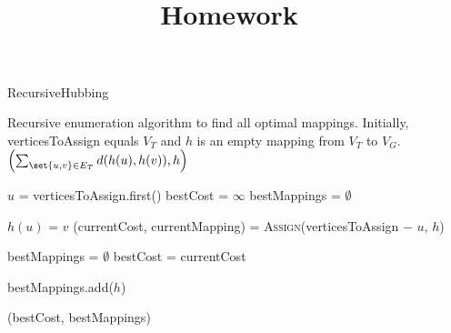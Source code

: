 \documentclass[language=english, number=1]{../lib/homework}
\title{\textbf{\hw@coursename}\\Homework~\hw@number}%
\begin{document}

    \begin{algorithm}
        \caption{RecursiveHubbing}
        \label{alg:TriangulateStar}
        \begin{algorithmic}[1]
            \Statex Recursive enumeration algorithm to find all optimal mappings. Initially, verticesToAssign equals $V_T$ and $h$ is an empty mapping from $V_T$ to $V_G$.
                    \State \Return $\left(\sum_{\set{u, v} \in E_T} d(h(u), h(v)), h \right)$ 
                \EndIf

                \State $u$ = verticesToAssign.first()
                \State bestCost = $\infty$
                \State bestMappings = $\emptyset$

                    \State $h(u)$ = $v$
                    \State (currentCost, currentMapping) = \textsc{Assign}(verticesToAssign $-$ $u$, $h$)

                            \State bestMappings = $\emptyset$
                            \State bestCost = currentCost
                        \EndIf

                        \State bestMappings.add($h$)
                    \EndIf

                \EndFor

                \State \Return (bestCost, bestMappings)
            \EndProcedure
        \end{algorithmic}
    \end{algorithm}
\end{document}
